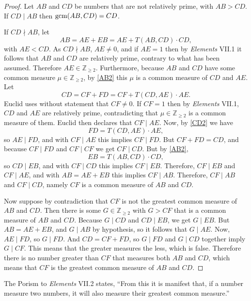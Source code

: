 \documentclass{article}
\newcommand{\gcm}{\ensuremath\mathrm{gcm}}
\begin{document}
\begin{proof}
Let $AB$ and $CD$ be numbers that are not relatively prime, with $AB>CD$. 
If $CD \mid AB$ then $\gcm(AB,CD)=CD$.

If $CD \nmid AB$, 
let
\begin{equation}
AB = AE+EB = AE + T(AB,CD) \cdot CD,
\label{AB2}
\end{equation}
with $AE<CD$. As $CD \nmid AB$, $AE \neq 0$, and if $AE = 1$ then by {\em Elements} VII.1 it follows that
$AB$ and $CD$ are relatively prime, contrary to what has been assumed.
Therefore $AE \in \mathbb{Z}_{\geq 2}$. Furthermore, because $AB$ and $CD$ have some common measure
$\mu \in \mathbb{Z}_{\geq 2}$, by \eqref{AB2} this $\mu$  is  a common
measure of $CD$ and $AE$.
Let
\begin{equation}
CD = CF + FD = CF + T(CD,AE)\cdot AE.
\label{CD2}
\end{equation}
Euclid uses without statement that $CF \neq 0$. If $CF = 1$ then by {\em Elements} VII.1,
$CD$ and $AE$ are relatively prime, contradicting that $\mu \in \mathbb{Z}_{\geq 2}$ is a common measure of them.
Euclid then declares that 
$CF \mid AE$. 
Now, by \eqref{CD2} we have
\[
FD = T(CD,AE) \cdot AE,
\]
so $AE \mid FD$, 
and with 
$CF \mid AE$ this implies 
$CF \mid FD$. But $CF+FD = CD$, and because $CF \mid FD$
and $CF \mid CF$ we get $CF \mid CD$. 
But by \eqref{AB2}, 
\[
EB = T(AB,CD) \cdot CD,
\]
so $CD \mid EB$, and with $CF \mid CD$ this implies
$CF \mid EB$. Therefore, $CF \mid EB$ and $CF \mid AE$, and with  $AB = AE+EB$ this implies
 $CF \mid AB$. Therefore, $CF \mid AB$ and $CF \mid CD$, namely $CF$ is a common measure of $AB$ and $CD$.

Now suppose by contradiction that $CF$ is not the greatest common measure of $AB$ and $CD$. 
Then there is some $G \in \mathbb{Z}_{\geq 2}$ with $G>CF$ that is a common measure
of $AB$ and $CD$. 
Because $G \mid CD$ and $CD \mid EB$, we get $G \mid EB$. But $AB = AE + EB$, and $G \mid AB$ by hypothesis, so it follows that
$G \mid AE$.  
Now, $AE \mid FD$, so $G \mid FD$. And $CD = CF + FD$, so $G \mid FD$ and $G \mid CD$ together imply
$G \mid CF$. This means that the greater measures the less, which is false. 
Therefore there is no number greater than $CF$ that measures both $AB$ and $CD$, which means that 
$CF$ is the greatest common measure of $AB$ and $CD$.
\end{proof}

The Porism to {\em Elements} VII.2 states, ``From this it is manifest that, if a number
 measure two numbers, it will also measure their greatest common measure.''
 
\end{document}
